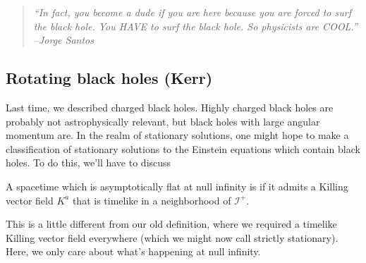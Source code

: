 \begin{quote}
    \textit{``In fact, you become a dude if you are here because you are forced to surf the black hole. You HAVE to surf the black hole. So physicists are COOL.'' --Jorge Santos}
\end{quote}


\subsection*{Rotating black holes (Kerr)}
Last time, we described charged black holes. Highly charged black holes are probably not astrophysically relevant, but black holes with large angular momentum are. In the realm of stationary solutions, one might hope to make a classification of stationary solutions to the Einstein equations which contain black holes. To do this, we'll have to discuss 

\begin{defn}
    A spacetime which is asymptotically flat at null infinity is  if it admits a Killing vector field $K^a$ that is timelike in a neighborhood of $\mathcal{I}^+$.
\end{defn}
This is a little different from our old definition, where we required a timelike Killing vector field everywhere (which we might now call strictly stationary). Here, we only care about what's happening at null infinity.

